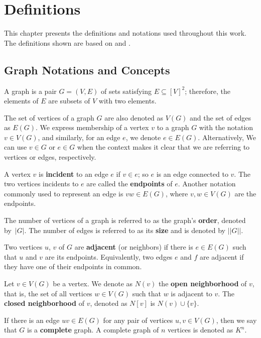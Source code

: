 \chapter{Definitions}
\label{chapter:definitions}

This chapter presents the definitions and notations used throughout this work. The definitions shown are based on \cite{BondyNMurty} and \cite{Diestel}.

\section{Graph Notations and Concepts}

A graph is a pair \(G = (V, E)\) of sets satisfying \(E \subseteq [V]^2\); therefore, the elements of \(E\) are subsets of \(V\) with two elements. 

The set of vertices of a graph $G$ are also denoted as \(V(G)\) and the set of edges as \(E(G)\). We express membership of a vertex \(v\) to a graph \(G\) with the notation \(v \in V(G)\), and similarly, for an edge \(e\), we denote \(e \in E(G)\). Alternatively, We can use \(v \in G\) or \(e \in G\) when the context makes it clear that we are referring to vertices or edges, respectively.

A vertex \(v\) is \textbf{incident} to an edge \(e\) if \(v \in e\); so \(e\) is an edge connected to \(v\). The two vertices incidents to \(e\) are called the \textbf{endpoints} of \(e\). Another notation commonly used to represent an edge is \(vw \in E(G)\), where \(v, w \in V(G)\) are the endpoints.

The number of vertices of a graph is referred to as the graph's \textbf{order}, denoted by~\(|G|\). The number of edges is referred to as its \textbf{size} and is denoted by \(||G||\).

Two vertices \(u\), \(v\) of \(G\) are \textbf{adjacent} (or neighbors) if there is \(e \in E(G)\) such that \(u\) and \(v\) are its endpoints. Equivalently, two edges \(e\) and \(f\) are adjacent if they have one of their endpoints in common.

Let \(v \in V(G)\) be a vertex. We denote as \(N(v)\) the \textbf{open neighborhood} of \(v\), that is, the set of all vertices \(w \in V(G)\) such that \(w\) is adjacent to \(v\). The \textbf{closed neighborhood} of \(v\), denoted as \(N[v]\) is \(N(v) \cup \{v\}\).

If there is an edge \(uv \in E(G)\) for any pair of vertices \(u, v \in V(G)\),  then we say that \(G\) is a \textbf{complete} graph. A complete graph of \(n\) vertices is denoted as \(K^n\).

